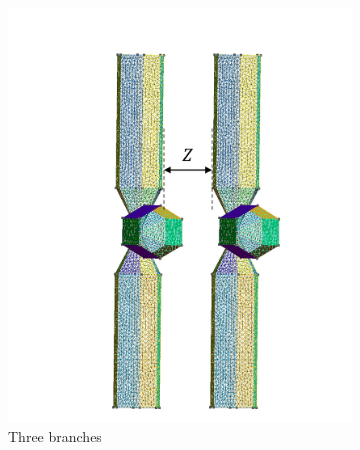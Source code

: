 \begin{figure}[H]
\begin{subfigure}{0.3\linewidth}
            \includegraphics[scale = 0.4]{figures/3branches}
            \caption{Three branches}
            \end{subfigure}
            \begin{subfigure}{0.3\linewidth}
                \centering

\end{subfigure}
\end{figure}
